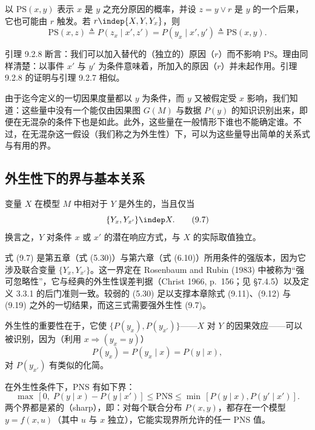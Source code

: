 \begin{lemma}
以 $\mathrm{PS}(x,y)$ 表示 $x$ 是 $y$ 之充分原因的概率，并设 $z=y\vee r$ 是 $y$ 的一个后果，它也可能由 $r$ 触发。若 $r\indep\{X,Y,Y_x\}$，则
\[
\mathrm{PS}(x,z)\triangleq P(z_x\mid x',z')=P(y_x\mid x',y')\triangleq\mathrm{PS}(x,y).
\]
\end{lemma}

引理 9.2.8 断言：我们可以加入替代的（独立的）原因（$r$）而不影响 PS。理由同样清楚：以事件 $x'$ 与 $y'$ 为条件意味着，所加入的原因（$r$）并未起作用。引理 9.2.8 的证明与引理 9.2.7 相似。

由于迄今定义的一切因果度量都以 $y$ 为条件，而 $y$ 又被假定受 $x$ 影响，我们知道：这些量中没有一个能仅由因果图 $G(M)$ 与数据 $P(y)$ 的知识识别出来，即便在无混杂的条件下也是如此。此外，这些量在一般情形下谁也不能确定谁。不过，在无混杂这一假设（我们称之为外生性）下，可以为这些量导出简单的关系式与有用的界。

\subsection{外生性下的界与基本关系}

\begin{definition}[外生性]
变量 $X$ 在模型 $M$ 中相对于 $Y$ 是外生的，当且仅当
\begin{equation}
\{Y_x,Y_{x'}\}\indep X. \tag{9.7}
\end{equation}
换言之，$Y$ 对条件 $x$ 或 $x'$ 的潜在响应方式，与 $X$ 的实际取值独立。
\end{definition}

式 \textup{(9.7)} 是第五章（式 \textup{(5.30)}）与第六章（式 \textup{(6.10)}）所用条件的强版本，因为它涉及联合变量 $\{Y_x,Y_{x'}\}$。这一界定在 Rosenbaum and Rubin (1983) 中被称为“强可忽略性”，它与经典的外生性误差判据（Christ 1966, p.~156；见 \S 7.4.5）以及定义 3.3.1 的后门准则一致。较弱的 \textup{(5.30)} 足以支撑本章除式 \textup{(9.11)}、\textup{(9.12)} 与 \textup{(9.19)} 之外的一切结果，而这三式需要强外生性 \textup{(9.7)}。

外生性的重要性在于，它使 $\{P(y_x),P(y_{x'})\}$——$X$ 对 $Y$ 的因果效应——可以被识别，因为（利用 $x\Rightarrow(y_x=y)$）
\begin{equation}
P(y_x)=P(y_x\mid x)=P(y\mid x), \tag{9.8}
\end{equation}
对 $P(y_{x'})$ 有类似的化简。

\begin{theorem}
在外生性条件下，PNS 有如下界：
\begin{equation}
\max\,[0,\;P(y\mid x)-P(y\mid x')]\le\mathrm{PNS}\le\min\,[P(y\mid x),P(y'\mid x')]. \tag{9.9}
\end{equation}
两个界都是紧的（sharp），即：对每个联合分布 $P(x,y)$，都存在一个模型 $y=f(x,u)$（其中 $u$ 与 $x$ 独立），它能实现界所允许的任一 PNS 值。
\end{theorem}

